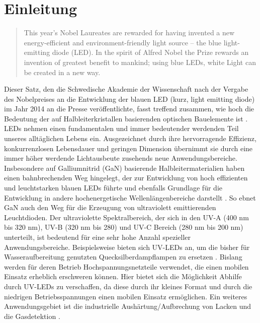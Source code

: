 
\chapter{Einleitung}
\thispagestyle{fancy}

\begin{quote}
This year’s Nobel Laureates are rewarded for having invented a new energy-efficient and environment-friendly light source – the blue light-emitting diode (LED). In the spirit of Alfred Nobel the Prize rewards an invention of greatest benefit to mankind; using blue LEDs, white Light can be created in a new way. \cite{nobelp} \end{quote}
\noindent
Dieser Satz, den die Schwedische Akademie der Wissenschaft nach der Vergabe des Nobelpreises an die Entwicklung der blauen LED (kurz, light emitting diode) im Jahr 2014 an die Presse veröffentlichte, fasst treffend zusammen, wie hoch die Bedeutung der auf Halbleiterkristallen basierenden optischen Bauelemente ist \cite{kneissl}. LEDs nehmen einen fundamentalen und immer bedeutender werdenden Teil unseres alltäglichen Lebens ein. Ausgezeichnet durch ihre hervorragende Effizienz, konkurrenzlosen Lebensdauer und geringen Dimension übernimmt sie durch eine immer höher werdende Lichtausbeute zusehends neue Anwendungsbereiche. Insbesondere auf Galliumnitrid (GaN) basierende Halbleitermaterialien haben einen bahnbrechenden Weg hingelegt, der zur Entwicklung von hoch effizienten und leuchtstarken blauen LEDs führte und ebenfalls Grundlage für die Entwicklung in andere hochenergetische Wellenlängenbereiche darstellt \cite{risk} \cite{Shuji1999CandelaclassHI} \cite{10007979421}. So ebnet GaN auch den Weg für die Erzeugung von ultraviolett emittierenden Leuchtdioden. Der ultraviolette Spektralbereich, der sich in den UV-A (400 nm bis 320 nm), UV-B (320 nm bis 280) und UV-C Bereich (280 nm bis 200 nm) unterteilt, ist bedeutend für eine sehr hohe Anzahl spezieller Anwendungsbereiche. Beispielsweise bieten sich UV-LEDs an, um die bisher für Wasseraufbereitung genutzten Quecksilberdampflampen zu ersetzen \cite{Vilhunen2009}  \cite{WURTELE2011148}. Bislang werden für deren Betrieb Hochspannungsnetzteile verwendet, die einen mobilen Einsatz erheblich erschweren können. Hier bietet sich die Möglichkeit Abhilfe durch UV-LEDs zu verschaffen, da diese durch ihr kleines Format und durch die niedrigen Betriebsspannungen einen mobilen Einsatz ermöglichen. Ein weiteres Anwendungsgebiet ist die industrielle Aushärtung/Aufbrechung von Lacken und die Gasdetektion \cite{0268-1242-26-1-014036} \cite{LALINSKY2010152}. 
